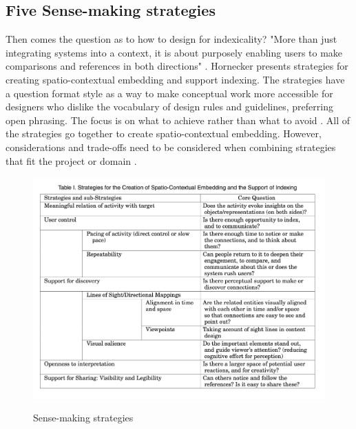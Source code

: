 \subsection{Five Sense-making strategies}
Then comes the question as to how to design for indexicality? "More than just integrating systems into a context, it is about purposely enabling users to make comparisons and references in both directions" \autocite[p. 34]{hornecker_to-and-fro_2016}. Hornecker presents strategies for creating spatio-contextual embedding and support indexing. The strategies have a question format style as a way to make conceptual work more accessible for designers who dislike the vocabulary of design rules and guidelines, preferring open phrasing\autocite[p. 34]{hornecker_to-and-fro_2016}. The focus is on what to achieve rather than what to avoid \autocite[p. 34]{hornecker_to-and-fro_2016}. All of the strategies go together to create spatio-contextual embedding. However, considerations and trade-offs need to be considered when combining strategies that fit the project or domain \autocite[p. 34]{hornecker_to-and-fro_2016}.

\begin{figure}[H]
\centering 
\includegraphics[width=12.5cm]{pictures/Theory/strategies.png}
\caption{Sense-making strategies}
\autocite[p. 35]{hornecker_to-and-fro_2016}
\end{figure}